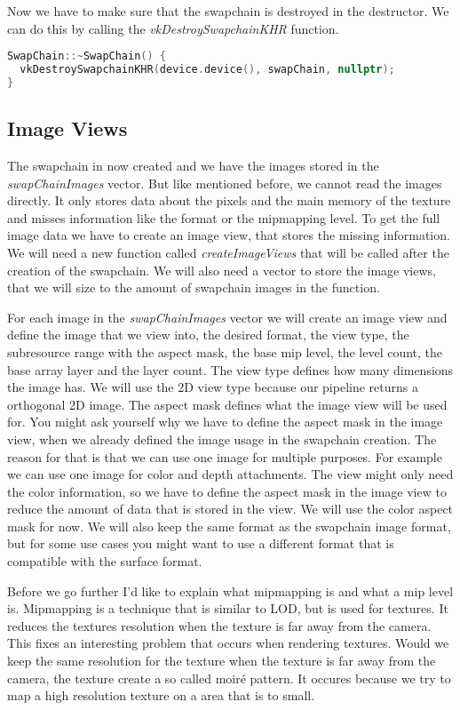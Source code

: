 \documentclass[12pt]{report} \usepackage{preamble}
\begin{document}
Now we have to make sure that the swapchain is destroyed in the destructor. We can do this by calling
the \textit{vkDestroySwapchainKHR} function.

\begin{lstlisting}[language=C++]
SwapChain::~SwapChain() {
  vkDestroySwapchainKHR(device.device(), swapChain, nullptr);
}
\end{lstlisting}

\subsection{Image Views}

The swapchain in now created and we have the images stored in the \\
\textit{swapChainImages} vector. But like mentioned before,
we cannot read the images directly. It only stores data about the pixels and the main memory of the texture and misses
information like the format or the mipmapping level. To get the full image data we have to create an image view, that
stores the missing information. We will need a new function called \textit{createImageViews} that will be called after
the creation of the swapchain. We will also need a vector to store the image views, that we will size to the amount of
swapchain images in the function.

For each image in the \textit{swapChainImages} vector we will create an image view and define the image that we view
into, the desired format, the view type, the subresource range with the aspect mask, the base mip level, the level count,
the base array layer and the layer count. The view type defines how many dimensions the image has. We will use the 2D view
type because our pipeline returns a orthogonal 2D image. The aspect mask defines what the image view will be used for.
You might ask yourself why we have to define the aspect mask in the image view, when we already defined the image usage
in the swapchain creation. The reason for that is that we can use one image for multiple purposes. For example we can use
one image for color and depth attachments. The view might only need the color information, so we have to define the aspect
mask in the image view to reduce the amount of data that is stored in the view. We will use the color aspect mask for now.
We will also keep the same format as the swapchain image format, but for some use cases you might want to use a different
format that is compatible with the surface format.

Before we go further I'd like to explain what mipmapping is and what a mip level is. Mipmapping is a technique that
is similar to \ac{LOD}, but is used for textures. It reduces the textures resolution when the texture
is far away from the camera. This fixes an interesting problem that occurs when rendering textures. Would we keep the same
resolution for the texture when the texture is far away from the camera, the texture create a so called moiré pattern.
It occures because we try to map a high resolution texture on a area that is to small.
\end{document}
